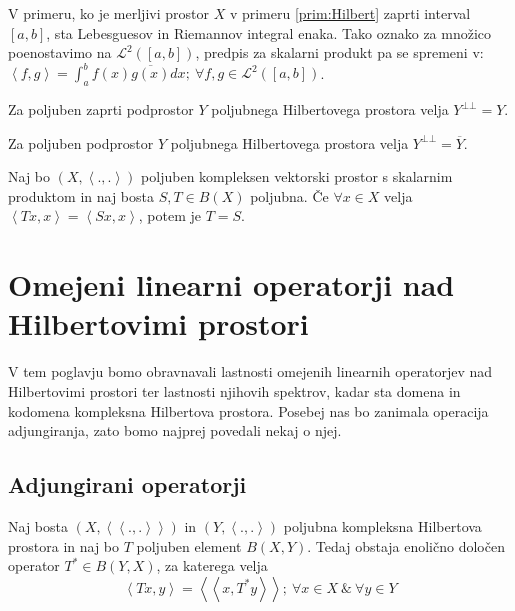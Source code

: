 \documentclass[mat2]{matdelo}
\newcommand{\Sp}[2]{\ensuremath{\left<#1, #2\right>}}
\newcommand{\Spp}[2]{\ensuremath{\left<\left<#1, #2\right>\right>}}
\begin{document}
		\begin{opomba}
			\label{opomb:Hilbert}
			V primeru, ko je merljivi prostor $X$ v primeru \ref{prim:Hilbert} zaprti interval $[a, b]$, sta Lebesguesov in Riemannov integral enaka. Tako oznako za množico poenostavimo na $\mathcal{L}^2([a, b])$, predpis za skalarni produkt pa se spremeni v: $\Sp{f}{g} = \int_{a}^{b}f(x)\overline{g(x)}dx;~\forall f, g \in \mathcal{L}^2([a, b])$.
		\end{opomba}
		
		\begin{posledica}
			\label{posl:zaportoggost}
			Za poljuben zaprti podprostor $Y$ poljubnega Hilbertovega prostora velja $Y^{\bot\bot} = Y$.
		\end{posledica}
		
		\begin{posledica}
			\label{posl:ortoggost}
			Za poljuben podprostor $Y$ poljubnega Hilbertovega prostora velja $Y^{\bot\bot} = \overline{Y}$.
		\end{posledica}
		
		\begin{lema}
			\label{lem:scalprodopenak}
			Naj bo $(X, \Sp{.}{.})$ poljuben kompleksen vektorski prostor s skalarnim produktom in naj bosta $S, T \in B(X)$ poljubna. Če $\forall x\in X$ velja $\Sp{Tx}{x} = \Sp{Sx}{x}$, potem je $T = S$.
		\end{lema}
		
	\section{Omejeni linearni operatorji nad Hilbertovimi prostori}
		V tem poglavju bomo obravnavali lastnosti omejenih linearnih operatorjev nad Hilbertovimi prostori ter lastnosti njihovih spektrov, kadar sta domena in kodomena kompleksna Hilbertova prostora. Posebej nas bo zanimala operacija adjungiranja, zato bomo najprej povedali nekaj o njej.
		\subsection{Adjungirani operatorji}
		
			\begin{izrek}
				\label{izr:Adjexist}
				Naj bosta $(X, \Spp{.}{.})$ in $(Y, \Sp{.}{.})$ poljubna kompleksna Hilbertova prostora in naj bo $T$ poljuben element $B(X, Y)$. Tedaj obstaja enolično določen operator $T^*\in B(Y, X)$, za katerega velja $$\Sp{Tx}{y} = \Spp{x}{T^*y};~\forall x\in X~\&~\forall y \in Y $$
			\end{izrek}
			
\end{document}
